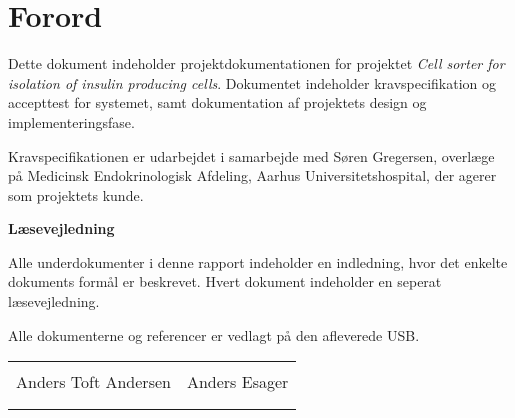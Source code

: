 \chapter*{Forord}

Dette dokument indeholder projektdokumentationen for projektet \textit{Cell sorter for isolation of insulin producing cells}. Dokumentet indeholder kravspecifikation og accepttest for systemet, samt dokumentation af projektets design og implementeringsfase. 

Kravspecifikationen er udarbejdet i samarbejde med Søren Gregersen, overlæge på Medicinsk Endokrinologisk Afdeling, Aarhus Universitetshospital, der agerer som projektets kunde. 

\textbf{Læsevejledning}

Alle underdokumenter i denne rapport indeholder en indledning, hvor det enkelte dokuments formål er beskrevet. Hvert dokument indeholder en seperat læsevejledning.


Alle dokumenterne og referencer er vedlagt på den afleverede USB.

\phantom{Luft}

\phantom{Luft}

\begin{table}[H]
	\centering
		\begin{tabular}{c c}
			\underline{\phantom{mmmmmmmmmmmmmm}} & \underline{\phantom{mmmmmmmmmmmmmm}}  \\
			Anders Toft Andersen			& Anders Esager		 			\\
			&\\
			&\\

		 																									
		\end{tabular}
\end{table}